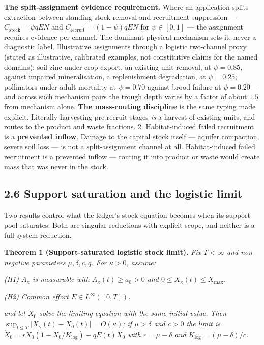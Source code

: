 \documentclass[11pt]{article}
\begin{document}
\textbf{The split-assignment evidence requirement.} Where an application splits extraction between standing-stock removal and recruitment suppression --- \(C_{\mathrm{stock}} = \psi qEN\) and \(C_{\mathrm{recruit}} =\allowbreak{} (1-\psi)qEN\) for \(\psi \in [0,1]\) --- the assignment requires evidence per channel. The dominant physical mechanism sets it, never a diagnostic label. Illustrative assignments through a logistic two-channel proxy (stated as illustrative, calibrated examples, not constitutive claims for the named domains): soil zinc under crop export, an existing-unit removal, at \(\psi = 0.85\), against impaired mineralisation, a replenishment degradation, at \(\psi = 0.25\); pollinators under adult mortality at \(\psi = 0.70\) against brood failure at \(\psi = 0.20\) --- and across such mechanism pairs the trough depth varies by a factor of about \(1.5\) from mechanism alone. \textbf{The mass-routing discipline} is the same typing made explicit. Literally harvesting pre-recruit stages \emph{is} a harvest of existing units, and routes to the product and waste fractions. 2. Habitat-induced failed recruitment is a \textbf{prevented inflow}. Damage to the capital stock itself --- aquifer compaction, severe soil loss --- is not a split-assignment channel at all. Habitat-induced failed recruitment is a prevented inflow --- routing it into product or waste would create mass that was never in the stock.

\subsection*{2.6 Support saturation and the logistic limit}\label{26-support-saturation-and-the-logistic-limit}

Two results control what the ledger's stock equation becomes when its support pool saturates. Both are singular reductions with explicit scope, and neither is a full-system reduction.

\textbf{Theorem 1 (Support-saturated logistic stock limit).} \emph{Fix \(T < \infty\) and non-negative parameters \(\mu, \delta, c, q\). For \(\kappa > 0\), assume:}

\emph{(H1) \(A_\kappa\) is measurable with \(A_\kappa(t) \ge a_0 > 0\) and \(0 \le X_\kappa(t) \le X_{\max}\).}

\emph{(H2) Common effort \(E \in L^\infty([0,T])\).}

\emph{and let \(X_0\) solve the limiting equation with the same initial value. Then \(\sup_{t \le T} |X_\kappa(t) - X_0(t)| =\allowbreak{} O(\kappa)\); if \(\mu > \delta\) and \(c > 0\) the limit is \(\dot X_0 =\allowbreak{} rX_0(1 - X_0/\allowbreak{}K_{\log}) - qE(t)X_0\) with \(r = \mu - \delta\) and \(K_{\log} = (\mu - \delta)/c\).}
\end{document}
